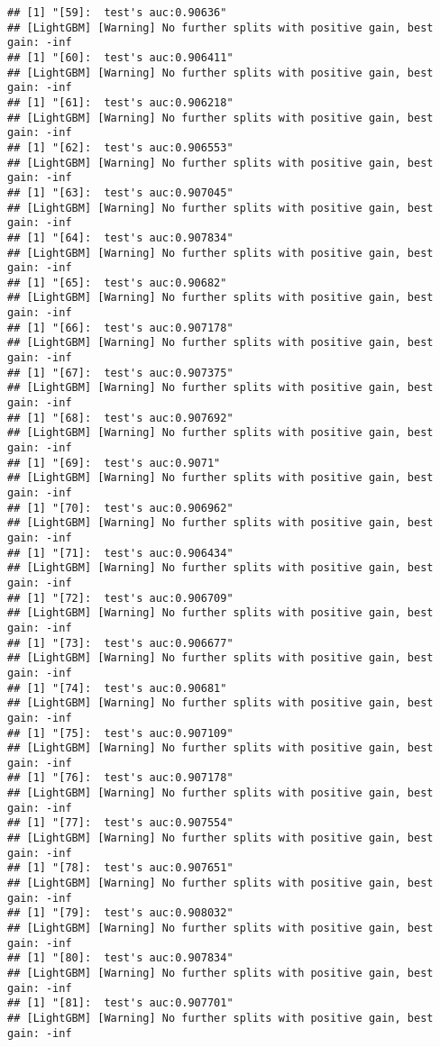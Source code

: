 \documentclass[
]{article}
\begin{document}
\begin{verbatim}
## [1] "[59]:  test's auc:0.90636"
## [LightGBM] [Warning] No further splits with positive gain, best gain: -inf
## [1] "[60]:  test's auc:0.906411"
## [LightGBM] [Warning] No further splits with positive gain, best gain: -inf
## [1] "[61]:  test's auc:0.906218"
## [LightGBM] [Warning] No further splits with positive gain, best gain: -inf
## [1] "[62]:  test's auc:0.906553"
## [LightGBM] [Warning] No further splits with positive gain, best gain: -inf
## [1] "[63]:  test's auc:0.907045"
## [LightGBM] [Warning] No further splits with positive gain, best gain: -inf
## [1] "[64]:  test's auc:0.907834"
## [LightGBM] [Warning] No further splits with positive gain, best gain: -inf
## [1] "[65]:  test's auc:0.90682"
## [LightGBM] [Warning] No further splits with positive gain, best gain: -inf
## [1] "[66]:  test's auc:0.907178"
## [LightGBM] [Warning] No further splits with positive gain, best gain: -inf
## [1] "[67]:  test's auc:0.907375"
## [LightGBM] [Warning] No further splits with positive gain, best gain: -inf
## [1] "[68]:  test's auc:0.907692"
## [LightGBM] [Warning] No further splits with positive gain, best gain: -inf
## [1] "[69]:  test's auc:0.9071"
## [LightGBM] [Warning] No further splits with positive gain, best gain: -inf
## [1] "[70]:  test's auc:0.906962"
## [LightGBM] [Warning] No further splits with positive gain, best gain: -inf
## [1] "[71]:  test's auc:0.906434"
## [LightGBM] [Warning] No further splits with positive gain, best gain: -inf
## [1] "[72]:  test's auc:0.906709"
## [LightGBM] [Warning] No further splits with positive gain, best gain: -inf
## [1] "[73]:  test's auc:0.906677"
## [LightGBM] [Warning] No further splits with positive gain, best gain: -inf
## [1] "[74]:  test's auc:0.90681"
## [LightGBM] [Warning] No further splits with positive gain, best gain: -inf
## [1] "[75]:  test's auc:0.907109"
## [LightGBM] [Warning] No further splits with positive gain, best gain: -inf
## [1] "[76]:  test's auc:0.907178"
## [LightGBM] [Warning] No further splits with positive gain, best gain: -inf
## [1] "[77]:  test's auc:0.907554"
## [LightGBM] [Warning] No further splits with positive gain, best gain: -inf
## [1] "[78]:  test's auc:0.907651"
## [LightGBM] [Warning] No further splits with positive gain, best gain: -inf
## [1] "[79]:  test's auc:0.908032"
## [LightGBM] [Warning] No further splits with positive gain, best gain: -inf
## [1] "[80]:  test's auc:0.907834"
## [LightGBM] [Warning] No further splits with positive gain, best gain: -inf
## [1] "[81]:  test's auc:0.907701"
## [LightGBM] [Warning] No further splits with positive gain, best gain: -inf

\end{verbatim}
\end{document}

